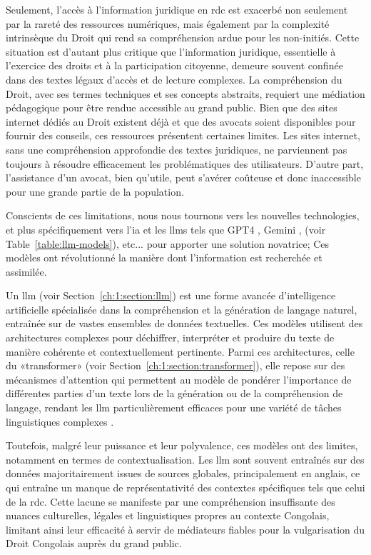 Seulement, l'accès à l'information juridique en \ac{rdc} est exacerbé non seulement par la rareté des ressources numériques, mais également par la complexité intrinsèque du Droit qui rend sa compréhension ardue pour les non-initiés. Cette situation est d'autant plus critique que l'information juridique, essentielle à l'exercice des droits et à la participation citoyenne, demeure souvent confinée dans des textes légaux d'accès et de lecture complexes. La compréhension du Droit, avec ses termes techniques et ses concepts abstraits, requiert une médiation pédagogique pour être rendue accessible au grand public. Bien que des sites internet dédiés au Droit existent déjà et que des avocats soient disponibles pour fournir des conseils, ces ressources présentent certaines limites. Les sites internet, sans une compréhension approfondie des textes juridiques, ne parviennent pas toujours à résoudre efficacement les problématiques des utilisateurs. D'autre part, l'assistance d'un avocat, bien qu'utile, peut s'avérer coûteuse et donc inaccessible pour une grande partie de la population.

Conscients de ces limitations, nous nous tournons vers les nouvelles technologies, et plus spécifiquement vers l'\ac{ia} et les \acfp{llm} tels que GPT4 \cite{openai2023gpt4}, Gemini \cite{geminiteam2023gemini}, (voir Table~\ref{table:llm-models}), etc... pour apporter une solution novatrice; Ces modèles ont révolutionné la manière dont l'information est recherchée et assimilée.

Un \ac{llm} (voir Section~\ref{ch:1:section:llm}) est une forme avancée d'intelligence artificielle spécialisée dans la compréhension et la génération de langage naturel, entraînée sur de vastes ensembles de données textuelles. Ces modèles utilisent des architectures complexes pour déchiffrer, interpréter et produire du texte de manière cohérente et contextuellement pertinente. Parmi ces architectures, celle du «transformer» \cite{Rothman2022Transformers} (voir Section~\ref{ch:1:section:transformer}), elle repose sur des mécanismes d'attention qui permettent au modèle de pondérer l'importance de différentes parties d'un texte lors de la génération ou de la compréhension de langage, rendant les \ac{llm} particulièrement efficaces pour une variété de tâches linguistiques complexes \cite{vaswani2023attention}.

Toutefois, malgré leur puissance et leur polyvalence, ces modèles ont des limites, notamment en termes de contextualisation. Les \ac{llm} sont souvent entraînés sur des données majoritairement issues de sources globales, principalement en anglais, ce qui entraîne un manque de représentativité des contextes spécifiques tels que celui de la \ac{rdc}. Cette lacune se manifeste par une compréhension insuffisante des nuances culturelles, légales et linguistiques propres au contexte Congolais, limitant ainsi leur efficacité à servir de médiateurs fiables pour la vulgarisation du Droit Congolais auprès du grand public.

